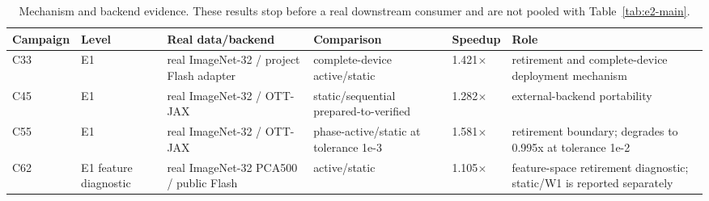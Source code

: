 \begin{table}[t]
\centering
\caption{Mechanism and backend evidence.  These results stop before a real downstream consumer and are not pooled with Table~\ref{tab:e2-main}.}
\label{tab:e1-mechanism}
\scriptsize
\setlength{\tabcolsep}{3pt}
\begin{tabular}{@{}llp{}p{}lp{}@{}}
\toprule
Campaign & Level & Real data/backend & Comparison & Speedup & Role \\
\midrule
C33 & E1 & real ImageNet-32 / project Flash adapter & complete-device active/static & 1.421$\times$ & retirement and complete-device deployment mechanism \\
C45 & E1 & real ImageNet-32 / OTT-JAX & static/sequential prepared-to-verified & 1.282$\times$ & external-backend portability \\
C55 & E1 & real ImageNet-32 / OTT-JAX & phase-active/static at tolerance 1e-3 & 1.581$\times$ & retirement boundary; degrades to 0.995x at tolerance 1e-2 \\
C62 & E1 feature diagnostic & real ImageNet-32 PCA500 / public Flash & active/static & 1.105$\times$ & feature-space retirement diagnostic; static/W1 is reported separately \\
\bottomrule
\end{tabular}
\end{table}
